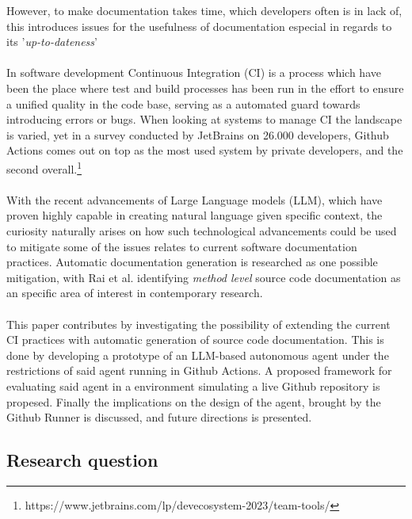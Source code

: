 However, to make documentation takes time, which developers often is in lack of, this introduces issues for the usefulness of documentation especial in regards to its '\textit{up-to-dateness}'\cite{aghajani2020software}
\\ \\
In software development Continuous Integration (CI) is a process which have been the place where test and build processes has been run in the effort to ensure a unified quality in the code base, serving as a automated guard towards introducing errors or bugs. When looking at systems to manage CI the landscape is varied, yet in a survey conducted by JetBrains on 26.000 developers, Github Actions comes out on top as the most used system by private developers, and the second overall.\footnote{https://www.jetbrains.com/lp/devecosystem-2023/team-tools/}
\\ \\
With the recent advancements of Large Language models (LLM), which have proven highly capable in creating natural language given specific context, the curiosity naturally arises on how such technological advancements could be used to mitigate some of the issues relates to current software documentation practices. Automatic documentation generation is researched as one possible mitigation, with Rai et al. identifying \textit{method level} source code documentation as an specific area of interest in contemporary research\cite{rai2022review}.
\\ \\
This paper contributes by investigating the possibility of extending the current CI practices with automatic generation of source code documentation. This is done by developing a prototype of an LLM-based autonomous agent under the restrictions of said agent running in Github Actions. A proposed framework for evaluating said agent in a environment simulating a live Github repository is propesed. Finally the implications on the design of the agent, brought by the Github Runner is discussed, and future directions is presented.

\subsection{Research question}
\researchQuestion
